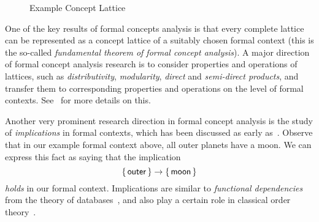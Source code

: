 \begin{figure}[tp]
\begin{center}
  \end{center}
  \caption{Example Concept Lattice}
  \label{fig:example-concept-lattice}
\end{figure}

One of the key results of formal concepts analysis is that every complete lattice can be
represented as a concept lattice of a suitably chosen formal context (this is the
so-called \emph{fundamental theorem of formal concept analysis}).  A major direction of
formal concept analysis research is to consider properties and operations of lattices,
such as \emph{distributivity}, \emph{modularity}, \emph{direct} and \emph{semi-direct
  products}, and transfer them to corresponding properties and operations on the level of
formal contexts.  See~\cite{fca-book} for more details on this.

Another very prominent research direction in formal concept analysis is the study of
\emph{implications} in formal contexts, which has been discussed as early
as~\cite{fca:Wille:1982}.  Observe that in our example formal context above, all outer
planets have a moon.  We can express this fact as saying that the implication
\begin{equation*}
  {\ensuremath{\{\, \mathsf{outer} \,\}}} \to {\ensuremath{\{\, \mathsf{moon} \,\}}}
\end{equation*}
\emph{holds} in our formal context.  Implications are similar to \emph{functional
  dependencies} from the theory of databases~\cite{DBLP:books/cs/Maier83}, and also play a
certain role in classical order theory~\cite{Wild1994118}.

